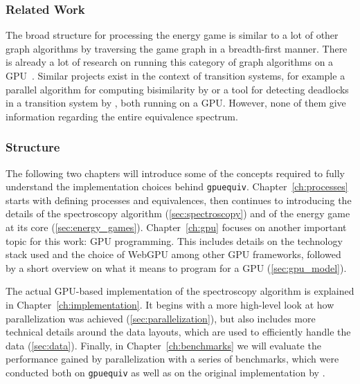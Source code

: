 \subsubsection{Related Work}

The broad structure for processing the energy game
is similar to a lot of other graph algorithms
by traversing the game graph in a breadth-first manner.
There is already a lot of research on running this category of graph
algorithms on a GPU~\cite{Merrill2015,Busato2018,Hijma2023}.
Similar projects exist in the context of transition systems,
for example a parallel algorithm for computing bisimilarity
by \textcite{Martens2023}
or a tool for detecting deadlocks in a transition system
by \textcite{Wijs2023},
both running on a GPU\@.
However, none of them give information
regarding the entire equivalence spectrum.

\subsubsection{Structure}

The following two chapters will introduce some of the concepts required to
fully understand the implementation choices behind \texttt{gpuequiv}.
Chapter~\ref{ch:processes} starts with defining processes and equivalences,
then continues to introducing the details of
the spectroscopy algorithm (\ref{sec:spectroscopy})
and of the energy game at its core (\ref{sec:energy_games}).
Chapter~\ref{ch:gpu} focuses on another important topic for this work:
GPU programming.
This includes details on the technology stack used
and the choice of WebGPU among other GPU frameworks,
followed by a short overview on what it means
to program for a GPU (\ref{sec:gpu_model}).

The actual GPU-based implementation of the spectroscopy algorithm is explained
in Chapter~\ref{ch:implementation}.
It begins with a more high-level look at how parallelization was achieved
(\ref{sec:parallelization}),
but also includes more technical details around the data layouts,
which are used to efficiently handle the data (\ref{sec:data}).
Finally, in Chapter~\ref{ch:benchmarks} we will evaluate the performance
gained by parallelization with a series of benchmarks, which were
conducted both on \texttt{gpuequiv} as well as on the original implementation
by \textcite{bisping2023process}.
